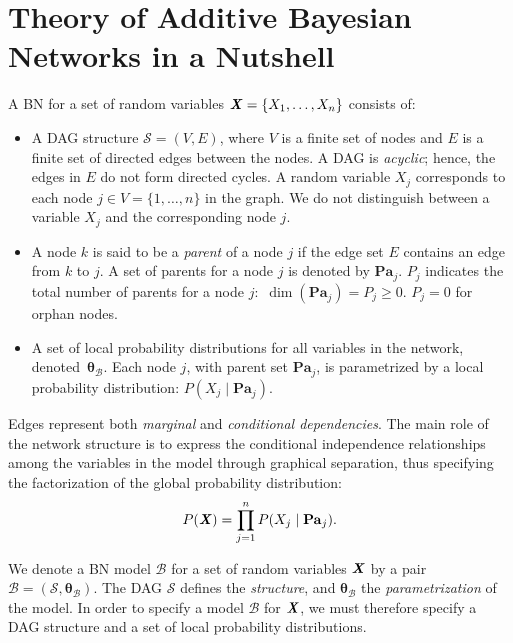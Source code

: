 \documentclass{svproc}
\newcommand{\btheta}{{\bm{\theta}}}
\newcommand{\X}{{\textbf{\textit{X}}}}
\newcommand{\Bay}{{\mathcal{B}}}
\newcommand{\Str}{{\mathcal{S}}}
\newcommand{\Par}{{\mathbf{Pa}_j}}
\begin{document}
\section{Theory of Additive Bayesian Networks  in a Nutshell}
\label{sec:2}
A BN for a set of random variables $\X = \{X_1,\dots, X_n\}$ consists of:
\begin{itemize}
\item A DAG structure $\Str = (\mathit{V},\mathit{E})$, where $\mathit{V}$ is a finite set of
nodes and $\mathit{E}$ is a finite set of directed edges between the nodes. A DAG is \emph{acyclic}; hence, the edges in $\mathit{E}$ do not form
directed cycles.
A random variable $X_j$ corresponds to each node $j \in \mathit{V} = \{1, \dots, n\}$ in the graph. We do not distinguish between a variable $X_j$ and
the corresponding node $j$.
\item A node $k$ is said to be a \emph{parent} of a node $j$ if the edge set $E$ contains an edge from $k$ to $j$.
 A set of parents for a node $j$ is denoted by $\Par$. 
$P_j$ indicates the total number of parents for a node $j: \,\, \dim(\Par)=P_j\geq0$.
$P_j=0$ for orphan nodes.
\item A set of local probability distributions for all
variables in the network, denoted~$\btheta_\Bay$. Each node $j$, with parent set $\Par$, is parametrized by a local probability
distribution: $P(X_j\mid \Par)$.
\end{itemize}
Edges represent both \textit{marginal} and \textit{conditional dependencies}.
The main role of the network structure is to express the conditional
independence relationships among the variables in the model
through graphical separation, thus specifying the factorization of
the global probability distribution:
 $$\displaystyle P(\X)=\prod_{j=1}^{n}P(X_j\mid \Par).$$

We denote a BN model $\Bay$ for a set of random variables $\X$ by a pair $\Bay=(\Str, \btheta_\Bay)$.
The DAG $\Str$ defines the \emph{structure}, and $\btheta_\Bay$ the \emph{parametrization} of the model.
In order to specify a model $\Bay$ for $\X$, we must therefore specify a DAG structure and a set of local probability distributions.
\end{document}
